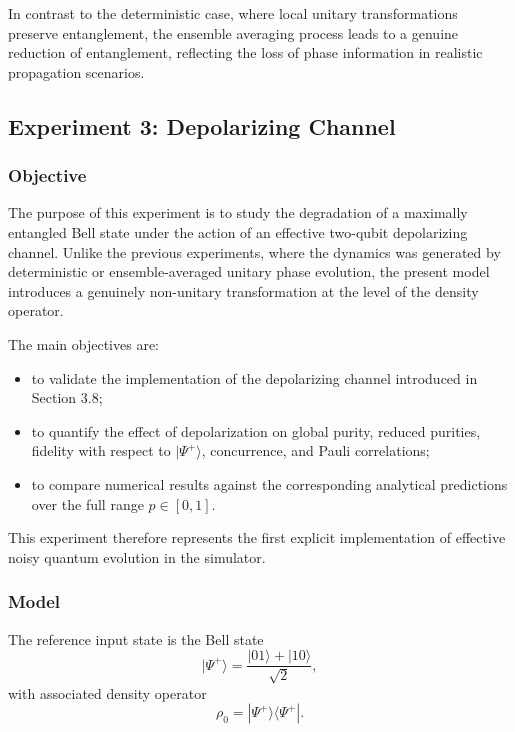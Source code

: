 \documentclass[a4paper]{article}
\begin{document}
In contrast to the deterministic case, where local unitary transformations preserve entanglement, the ensemble averaging process leads to a genuine reduction of entanglement, reflecting the loss of phase information in realistic propagation scenarios.

\subsection{Experiment 3: Depolarizing Channel}

\subsubsection{Objective}

The purpose of this experiment is to study the degradation of a maximally entangled Bell state under the action of an effective two-qubit depolarizing channel. Unlike the previous experiments, where the dynamics was generated by deterministic or ensemble-averaged unitary phase evolution, the present model introduces a genuinely non-unitary transformation at the level of the density operator.

The main objectives are:
\begin{itemize}
    \item to validate the implementation of the depolarizing channel introduced in Section 3.8;
    \item to quantify the effect of depolarization on global purity, reduced purities, fidelity with respect to \(|\Psi^+\rangle\), concurrence, and Pauli correlations;
    \item to compare numerical results against the corresponding analytical predictions over the full range \(p \in [0,1]\).
\end{itemize}

This experiment therefore represents the first explicit implementation of effective noisy quantum evolution in the simulator.

\subsubsection{Model}

The reference input state is the Bell state
\[
|\Psi^+\rangle = \frac{|01\rangle + |10\rangle}{\sqrt{2}},
\]
with associated density operator
\[
\rho_0 = |\Psi^+\rangle\langle\Psi^+|.
\]
\end{document}
